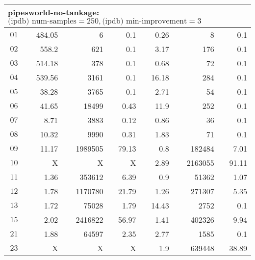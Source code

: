 \begin{longtable}{|c||r|r|r||r|r|r|}
\multicolumn{7}{|l|}{pipesworld-no-tankage: $\text{(ipdb) num-samples}=250,\text{(ipdb) min-improvement}=3$}\\\hline
$01$ & 484.05 & 6 & 0.1 &0.26 & 8 & 0.1 \\\hline
$02$ & 558.2 & 621 & 0.1 &3.17 & 176 & 0.1 \\\hline
$03$ & 514.18 & 378 & 0.1 &0.68 & 72 & 0.1 \\\hline
$04$ & 539.56 & 3161 & 0.1 &16.18 & 284 & 0.1 \\\hline
$05$ & 38.28 & 3765 & 0.1 &2.71 & 54 & 0.1 \\\hline
$06$ & 41.65 & 18499 & 0.43 &11.9 & 252 & 0.1 \\\hline
$07$ & 8.71 & 3883 & 0.12 &0.86 & 36 & 0.1 \\\hline
$08$ & 10.32 & 9990 & 0.31 &1.83 & 71 & 0.1 \\\hline
$09$ & 11.17 & 1989505 & 79.13 &0.8 & 182484 & 7.01 \\\hline
$10$ & X & X & X &2.89 & 2163055 & 91.11 \\\hline
$11$ & 1.36 & 353612 & 6.39 &0.9 & 51362 & 1.07 \\\hline
$12$ & 1.78 & 1170780 & 21.79 &1.26 & 271307 & 5.35 \\\hline
$13$ & 1.72 & 75028 & 1.79 &14.43 & 2752 & 0.1 \\\hline
$15$ & 2.02 & 2416822 & 56.97 &1.41 & 402326 & 9.94 \\\hline
$21$ & 1.88 & 64597 & 2.35 &2.77 & 1585 & 0.1 \\\hline
$23$ & X & X & X &1.9 & 639448 & 38.89 \\\hline


\end{longtable}
